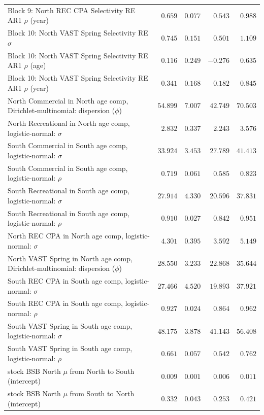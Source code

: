 \documentclass[
]{article}
\begin{document}
\begin{landscape}
\begin{longtable}[t]{lrrrr}
Block 9: North REC CPA Selectivity RE AR1 $\rho$ (year) & $0.659$ & $0.077$ & $0.543$ & $0.988$\\
Block 10: North VAST Spring Selectivity RE $\sigma$ & $0.745$ & $0.151$ & $0.501$ & $1.109$\\
\addlinespace
Block 10: North VAST Spring Selectivity RE AR1 $\rho$ (age) & $0.116$ & $0.249$ & $-0.276$ & $0.635$\\
Block 10: North VAST Spring Selectivity RE AR1 $\rho$ (year) & $0.341$ & $0.168$ & $0.182$ & $0.845$\\
North Commercial in North age comp, Dirichlet-multinomial: dispersion ($\phi$) & $54.899$ & $7.007$ & $42.749$ & $70.503$\\
North Recreational in North age comp, logistic-normal: $\sigma$ & $2.832$ & $0.337$ & $2.243$ & $3.576$\\
South Commercial in South age comp, logistic-normal: $\sigma$ & $33.924$ & $3.453$ & $27.789$ & $41.413$\\
\addlinespace
South Commercial in South age comp, logistic-normal: $\rho$ & $0.719$ & $0.061$ & $0.585$ & $0.823$\\
South Recreational in South age comp, logistic-normal: $\sigma$ & $27.914$ & $4.330$ & $20.596$ & $37.831$\\
South Recreational in South age comp, logistic-normal: $\rho$ & $0.910$ & $0.027$ & $0.842$ & $0.951$\\
North REC CPA in North age comp, logistic-normal: $\sigma$ & $4.301$ & $0.395$ & $3.592$ & $5.149$\\
North VAST Spring in North age comp, Dirichlet-multinomial: dispersion ($\phi$) & $28.550$ & $3.233$ & $22.868$ & $35.644$\\
\addlinespace
South REC CPA in South age comp, logistic-normal: $\sigma$ & $27.466$ & $4.520$ & $19.893$ & $37.921$\\
South REC CPA in South age comp, logistic-normal: $\rho$ & $0.927$ & $0.024$ & $0.864$ & $0.962$\\
South VAST Spring in South age comp, logistic-normal: $\sigma$ & $48.175$ & $3.878$ & $41.143$ & $56.408$\\
South VAST Spring in South age comp, logistic-normal: $\rho$ & $0.661$ & $0.057$ & $0.542$ & $0.762$\\
stock BSB North $\mu$ from North to South (intercept) & $0.009$ & $0.001$ & $0.006$ & $0.011$\\
\addlinespace
stock BSB North $\mu$ from South to North (intercept) & $0.332$ & $0.043$ & $0.253$ & $0.421$\\

\end{longtable}
\end{landscape}
\end{document}
